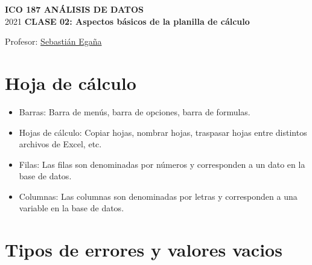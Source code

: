 \documentclass[12 pt,letterpaper]{article}
\begin{document}
%

	
	\pagestyle{fancy}
	\fancyhf{}
	\renewcommand{\headrulewidth}{0pt}
	\renewcommand{\footrulewidth}{0pt}	
	
\begin{center}
		
	\bigbreak
	\textbf{ICO 187 ANÁLISIS DE DATOS}\\
	\small{2021}
	\break
	\textbf{CLASE 02: Aspectos básicos de la planilla de cálculo}\\
\end{center}

\begin{flushright}	
		
	Profesor: \href{mailto:sebastianeganasa@santotomas.cl}{Sebastián Egaña}

\end{flushright}

\section{Hoja de cálculo}

\begin{itemize}
	\item Barras: Barra de menús, barra de opciones, barra de formulas. 
	
	\item Hojas de cálculo: Copiar hojas, nombrar hojas, traspasar hojas entre distintos archivos de Excel, etc. 
	
	\item Filas: Las filas son denominadas por números y corresponden a un dato en la base de datos. 
	
	\item Columnas: Las columnas son denominadas por letras y corresponden a una variable en la base de datos. 
	
\end{itemize}

\section{Tipos de errores y valores vacios}
\end{document}
